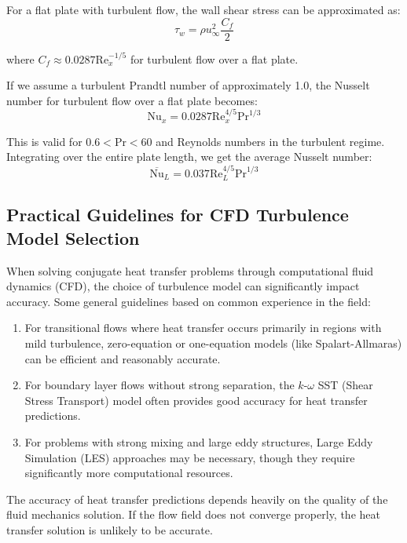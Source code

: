 For a flat plate with turbulent flow, the wall shear stress can be approximated as:
\[
\tau_w = \rho u_\infty^2 \frac{C_f}{2}
\]

where $C_f \approx 0.0287 \text{Re}_x^{-1/5}$ for turbulent flow over a flat plate.

If we assume a turbulent Prandtl number of approximately 1.0, the Nusselt number for turbulent flow over a flat plate becomes:
\[
\text{Nu}_x = 0.0287 \text{Re}_x^{4/5} \text{Pr}^{1/3}
\]

This is valid for $0.6 < \text{Pr} < 60$ and Reynolds numbers in the turbulent regime. Integrating over the entire plate length, we get the average Nusselt number:
\[
\overline{\text{Nu}}_L = 0.037 \text{Re}_L^{4/5} \text{Pr}^{1/3}
\]

\subsection*{Practical Guidelines for CFD Turbulence Model Selection}

When solving conjugate heat transfer problems through computational fluid dynamics (CFD), the choice of turbulence model can significantly impact accuracy. Some general guidelines based on common experience in the field:

\begin{enumerate}
    \item For transitional flows where heat transfer occurs primarily in regions with mild turbulence, zero-equation or one-equation models (like Spalart-Allmaras) can be efficient and reasonably accurate.
    
    \item For boundary layer flows without strong separation, the $k$-$\omega$ SST (Shear Stress Transport) model often provides good accuracy for heat transfer predictions.
    
    \item For problems with strong mixing and large eddy structures, Large Eddy Simulation (LES) approaches may be necessary, though they require significantly more computational resources.
\end{enumerate}

The accuracy of heat transfer predictions depends heavily on the quality of the fluid mechanics solution. If the flow field does not converge properly, the heat transfer solution is unlikely to be accurate.

